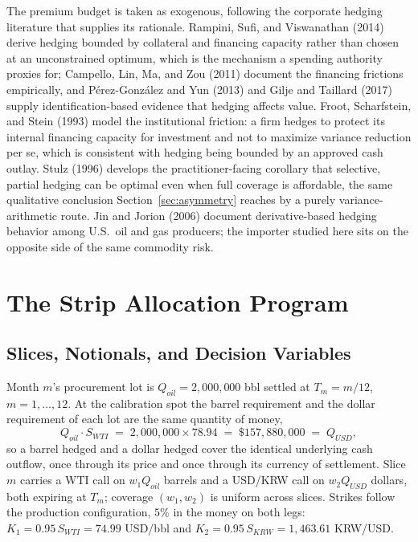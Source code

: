 \documentclass[11pt,a4paper]{article}
\begin{document}
The premium budget is taken as exogenous, following the corporate hedging literature that supplies its rationale. Rampini, Sufi, and Viswanathan (2014) derive hedging bounded by collateral and financing capacity rather than chosen at an unconstrained optimum, which is the mechanism a spending authority proxies for; Campello, Lin, Ma, and Zou (2011) document the financing frictions empirically, and P\'erez-Gonz\'alez and Yun (2013) and Gilje and Taillard (2017) supply identification-based evidence that hedging affects value. Froot, Scharfstein, and Stein (1993) model the institutional friction: a firm hedges to protect its internal financing capacity for investment and not to maximize variance reduction per se, which is consistent with hedging being bounded by an approved cash outlay. Stulz (1996) develops the practitioner-facing corollary that selective, partial hedging can be optimal even when full coverage is affordable, the same qualitative conclusion Section~\ref{sec:asymmetry} reaches by a purely variance-arithmetic route. Jin and Jorion (2006) document derivative-based hedging behavior among U.S.\ oil and gas producers; the importer studied here sits on the opposite side of the same commodity risk.

\section{The Strip Allocation Program}
\label{sec:problem}

\subsection{Slices, Notionals, and Decision Variables}

Month $m$'s procurement lot is $Q_{oil}=2{,}000{,}000$ bbl settled at $T_m=m/12$, $m=1,\dots,12$. At the calibration spot the barrel requirement and the dollar requirement of each lot are the same quantity of money,
\begin{equation}
Q_{oil}\cdot S_{WTI} \;=\; 2{,}000{,}000 \times 78.94 \;=\; \$157{,}880{,}000 \;=\; Q_{USD},
\label{eq:notionalidentity}
\end{equation}
so a barrel hedged and a dollar hedged cover the identical underlying cash outflow, once through its price and once through its currency of settlement. Slice $m$ carries a WTI call on $w_1 Q_{oil}$ barrels and a USD/KRW call on $w_2 Q_{USD}$ dollars, both expiring at $T_m$; coverage $(w_1,w_2)$ is uniform across slices. Strikes follow the production configuration, $5\%$ in the money on both legs: $K_1=0.95\,S_{WTI}=74.99$ USD/bbl and $K_2=0.95\,S_{KRW}=1{,}463.61$ KRW/USD.
\end{document}

